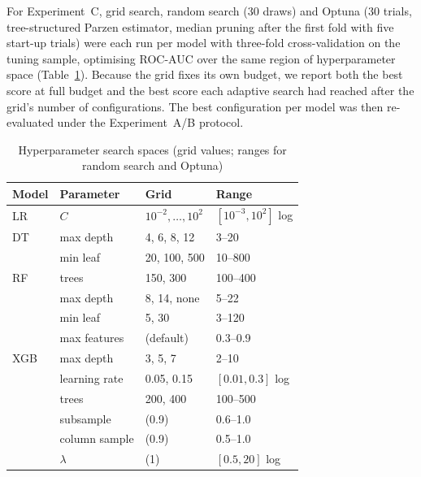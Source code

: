 \documentclass[conference]{IEEEtran}
\begin{document}
For Experiment~C, grid search, random search (30 draws) and Optuna (30 trials, tree-structured Parzen estimator, median pruning after the first fold with five start-up trials) were each run per model with three-fold cross-validation on the tuning sample, optimising ROC-AUC over the same region of hyperparameter space (Table~\ref{tab:space}). Because the grid fixes its own budget, we report both the best score at full budget and the best score each adaptive search had reached after the grid's number of configurations. The best configuration per model was then re-evaluated under the Experiment~A/B protocol.

\begin{table}[t]
\caption{Hyperparameter search spaces (grid values; ranges for random search and Optuna)}
\label{tab:space}
\centering
\footnotesize
\begin{tabular}{@{}llll@{}}
\toprule
Model & Parameter & Grid & Range \\
\midrule
LR & $C$ & $10^{-2},\dots,10^{2}$ & $[10^{-3},10^{2}]$ log \\
DT & max depth & 4, 6, 8, 12 & 3--20 \\
 & min leaf & 20, 100, 500 & 10--800 \\
RF & trees & 150, 300 & 100--400 \\
 & max depth & 8, 14, none & 5--22 \\
 & min leaf & 5, 30 & 3--120 \\
 & max features & (default) & 0.3--0.9 \\
XGB & max depth & 3, 5, 7 & 2--10 \\
 & learning rate & 0.05, 0.15 & $[0.01,0.3]$ log \\
 & trees & 200, 400 & 100--500 \\
 & subsample & (0.9) & 0.6--1.0 \\
 & column sample & (0.9) & 0.5--1.0 \\
 & $\lambda$ & (1) & $[0.5,20]$ log \\
\bottomrule
\end{tabular}
\end{table}
\end{document}
